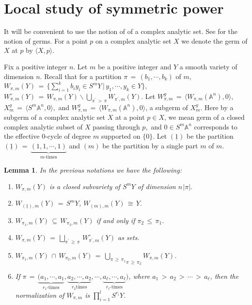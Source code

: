\documentclass[12pt,reqno]{amsart}
\newtheorem{lemma}{Lemma}[section]
\theoremstyle{definition}
\numberwithin{equation}{section}
\begin{document}
\section{Local study of symmetric power}
It will be convenient to use the notion of  of a complex analytic set. See {\cite[Chapter 2]{Hu}} for the notion of germs. For a point $p$ on a complex analytic set $X$ we denote the germ of $X$ at $p$ by $\langle X, p\rangle$.

Fix a positive integer $n$. Let $m$ be a positive integer and $Y$ a smooth variety of dimension $n$. Recall that for a partition $ \pi\,=\, (b_{1},\cdots,b_{k})$ of $m,$  $ W_{\pi,m}(Y)\,=\, \{ \sum_{i=1}^{k}b_{i}y_{i} \in S^{m}Y\,{|}\, y_{1},\cdots, y_{k}\in Y\}$, $ W_{\pi,m}^{\circ}(Y)\,=\, W_{\pi,m}(Y) \backslash \underset {{\pi^{\prime} \,>\, \pi}}{\bigcup} W_{\pi^{\prime},m}(Y)    $. Let  $W_{\pi,m}^{g}\,=\, \langle W_{\pi,m}(\mathbb{A}^{n}),0 \rangle$, $ X_{m}^{g}\,=\, \langle S^{m}\mathbb{A}^n, 0 \rangle, $  and $W_{\pi,m}^{g}\,=\, \langle W_{\pi,m}(\mathbb{A}^n),0 \rangle $, a subgerm of $ X_{m}^{g}.$ Here by a subgerm of a complex analytic set $X$ at a point $p\in X$, we mean germ of a closed complex analytic subset of $X$ passing through $p,$ and $0\in S^m \mathbb{A}^n$ corresponds to the effective $0$-cycle of degree $m$ supported on $\{0\}$. Let $(\underline{1})$
be the partition $ (\underline{1})\,=\, \underbrace{(1,1,\cdots,1)}_{m\text{-times}}$ and $(m)$ be the partition by a single part $m$ of $m$.
\vspace{7pt}

\begin{lemma}\label{prelim} In the previous notations we have the following:
\begin{enumerate}
\item[$(i)$] $W_{\pi, m}(Y)$ is a closed subvariety of $ S^{m}Y$ of dimension $n \hspace{1pt}|\pi|.$

\item[$(ii)$] $ W_{(\underline{1}),m}(Y)\,=\, S^{m}Y$, $ W_{(m),m}(Y)\, \cong\, Y.$ 
    
\item[$(iii)$] $ W_{\pi_{{1}},m}(Y)\, \subseteq\, W_{\pi_{2},m}(Y)$ if and only if $\pi_{2}\, \leq\, \pi_{1}$.\
    
\item[$(iv)$] $W_{\pi,m}(Y)\,=\,\underset{\pi^{\prime}\, \geq\, \pi}{\bigsqcup}\, W^{\circ}_{\pi^{\prime},m}(Y)$ as sets. 
\item[$(v)$] $W_{\pi_{1},m}(Y)\, \cap\, W_{\pi_{2},m}(Y)\,=\,\underset{\pi\, \geq\, \pi_{2}}{\underset{\pi\,\geq\,\pi_{1}}{\bigcup}} W_{\pi,m}(Y)$. 

\item[$(vi)$] If $ \pi\,=\, \underbrace{(a_{1},\cdots,a_{1}}_{r_{1}\text{-times}}, \underbrace{a_{2},\cdots, a_{2}}_{r_{2}\text{times}}, \cdots, \underbrace{a_{\ell},\cdots, a_{\ell}}_{r_{\ell}\text{-times}})$, where $ a_{1}\,>\, a_{2}\,>\, \cdots\,>\, a_{\ell}$, then the normalization of $W_{\pi,m}$ is $ \prod_{i=1}^{l}S^{r_{i}}Y.$
\end{enumerate} 
\end{lemma}
\end{document}

